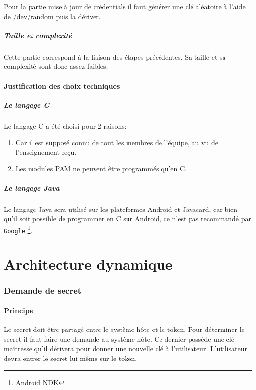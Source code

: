 \documentclass{"../../res/univ-projet"}
\begin{document}
  Pour la partie mise à jour de crédentials il faut générer une clé aléatoire
  à l'aide de /dev/random puis la dériver.
  
\subsubsection{Taille et complexité}
  Cette partie correspond à la liaison des étapes précédentes. Sa taille et
  sa complexité sont donc assez faibles.
  
\subsection{Justification des choix techniques}
\subsubsection{Le langage C}
Le langage C a été choisi pour 2 raisons:
\begin{enumerate}
    \item Car il est supposé connu de tout les membres de l'équipe, au vu
        de l'enseignement reçu.
    \item Les modules PAM ne peuvent être programmés qu'en C.
\end{enumerate}

\subsubsection{Le langage Java}
    Le langage Java sera utilisé sur les plateformes Android
    et Javacard, car bien qu'il soit possible de programmer en C
    sur Android, ce n'est pas recommandé par \verb?Google?
    \footnote{\href{https://developer.android.com/tools/sdk/ndk/index.html}{Android NDK}}.
        
\part*{Architecture dynamique}

\section{Demande de secret}
\subsection{Principe}
Le secret doit être partagé entre le système hôte et le token. Pour déterminer
le secret il faut faire une demande au système hôte. Ce dernier possède une clé
maîtresse qu'il dérivera pour donner une nouvelle clé à l'utilisateur. L'utilisateur
devra entrer le secret lui même sur le token.
\end{document}
